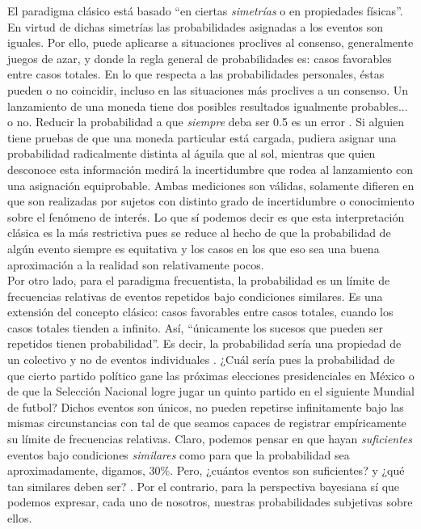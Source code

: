 	El paradigma clásico está basado ``en ciertas \textit{simetrías} o en propiedades físicas''\parencite[19; itálicas en el original]{GP16}. En virtud de dichas simetrías las probabilidades asignadas a los eventos son iguales. Por ello, puede aplicarse a situaciones proclives al consenso, generalmente juegos de azar, y donde la regla general de probabilidades es: casos favorables entre casos totales. En lo que respecta a las probabilidades personales, éstas pueden o no coincidir, incluso en las situaciones más proclives a un consenso. Un lanzamiento de una moneda tiene dos posibles resultados igualmente probables... o no. Reducir la probabilidad a que \textit{siempre} deba ser 0.5 es un error \parencite[28]{Nozer17}. Si alguien tiene pruebas de que una moneda particular está cargada, pudiera asignar una probabilidad radicalmente distinta al águila que al sol, mientras que quien desconoce esta información medirá la incertidumbre que rodea al lanzamiento con una asignación equiprobable. Ambas mediciones son válidas, solamente difieren en que son realizadas por sujetos con distinto grado de incertidumbre o conocimiento sobre el fenómeno de interés. Lo que sí podemos decir es que esta interpretación clásica es la más restrictiva pues se reduce al hecho de que la probabilidad de algún evento siempre es equitativa y los casos en los que eso sea una buena aproximación a la realidad son relativamente pocos.\\	 
	 
	Por otro lado, para el paradigma frecuentista, la probabilidad es un límite de frecuencias relativas de eventos repetidos bajo condiciones similares. Es una extensión del concepto clásico: casos favorables entre casos totales, cuando los casos totales tienden a infinito. Así, ``únicamente los sucesos que pueden ser repetidos tienen probabilidad''\parencite[4]{Aquino10}. Es decir, la probabilidad sería una propiedad de un colectivo  y no de eventos individuales \parencite[17]{Nozer17}. ¿Cuál sería pues la probabilidad de que cierto partido político gane las próximas elecciones presidenciales en México o de que la Selección Nacional logre jugar un quinto partido en el siguiente Mundial de futbol? Dichos eventos son únicos, no pueden repetirse infinitamente bajo las mismas circunstancias con tal de que seamos capaces de registrar empíricamente su límite de frecuencias relativas. Claro, podemos pensar en que hayan \textit{suficientes} eventos bajo condiciones \textit{similares} como para que la probabilidad sea aproximadamente, digamos, 30\%. Pero, ¿cuántos eventos son suficientes? y ¿qué tan similares deben ser? \parencite[23-24]{Nozer17}. Por el contrario, para la perspectiva bayesiana sí que podemos expresar, cada uno de nosotros, nuestras probabilidades subjetivas sobre ellos.\\ 
	

